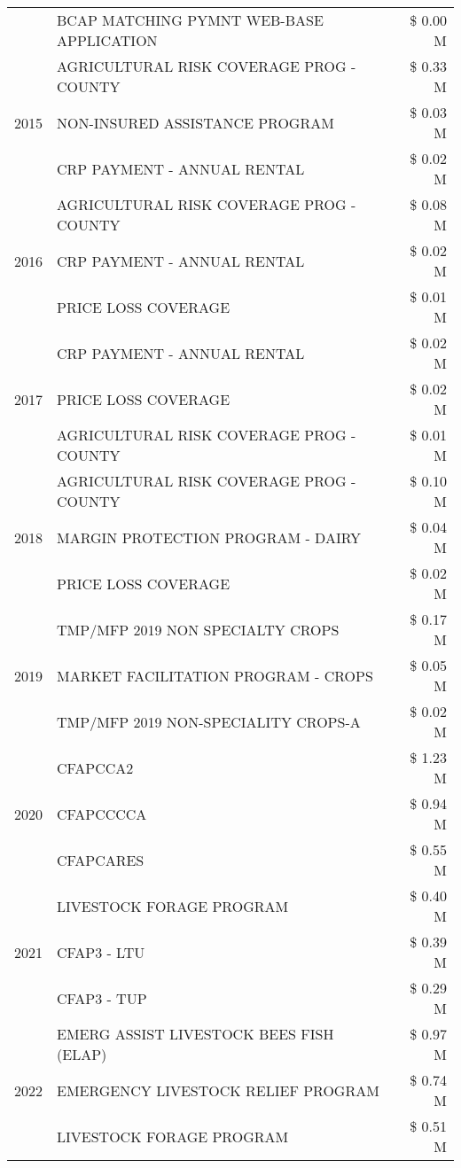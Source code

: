 \begin{tabular}{llr}
 & BCAP MATCHING PYMNT WEB-BASE APPLICATION & \$ 0.00 M \\
\cline{1-3}
\multirow[t]{3}{*}{2015} & AGRICULTURAL RISK COVERAGE PROG - COUNTY & \$ 0.33 M \\
 & NON-INSURED ASSISTANCE PROGRAM & \$ 0.03 M \\
 & CRP PAYMENT - ANNUAL RENTAL & \$ 0.02 M \\
\cline{1-3}
\multirow[t]{3}{*}{2016} & AGRICULTURAL RISK COVERAGE PROG - COUNTY & \$ 0.08 M \\
 & CRP PAYMENT - ANNUAL RENTAL & \$ 0.02 M \\
 & PRICE LOSS COVERAGE & \$ 0.01 M \\
\cline{1-3}
\multirow[t]{3}{*}{2017} & CRP PAYMENT - ANNUAL RENTAL & \$ 0.02 M \\
 & PRICE LOSS COVERAGE & \$ 0.02 M \\
 & AGRICULTURAL RISK COVERAGE PROG - COUNTY & \$ 0.01 M \\
\cline{1-3}
\multirow[t]{3}{*}{2018} & AGRICULTURAL RISK COVERAGE PROG - COUNTY & \$ 0.10 M \\
 & MARGIN PROTECTION PROGRAM - DAIRY & \$ 0.04 M \\
 & PRICE LOSS COVERAGE & \$ 0.02 M \\
\cline{1-3}
\multirow[t]{3}{*}{2019} & TMP/MFP 2019 NON SPECIALTY CROPS & \$ 0.17 M \\
 & MARKET FACILITATION PROGRAM - CROPS & \$ 0.05 M \\
 & TMP/MFP 2019 NON-SPECIALITY CROPS-A & \$ 0.02 M \\
\cline{1-3}
\multirow[t]{3}{*}{2020} & CFAPCCA2 & \$ 1.23 M \\
 & CFAPCCCCA & \$ 0.94 M \\
 & CFAPCARES & \$ 0.55 M \\
\cline{1-3}
\multirow[t]{3}{*}{2021} & LIVESTOCK FORAGE PROGRAM & \$ 0.40 M \\
 & CFAP3 - LTU & \$ 0.39 M \\
 & CFAP3 - TUP & \$ 0.29 M \\
\cline{1-3}
\multirow[t]{3}{*}{2022} & EMERG ASSIST LIVESTOCK BEES FISH (ELAP) & \$ 0.97 M \\
 & EMERGENCY LIVESTOCK RELIEF PROGRAM & \$ 0.74 M \\
 & LIVESTOCK FORAGE PROGRAM & \$ 0.51 M \\
\cline{1-3}
\bottomrule
\end{tabular}
